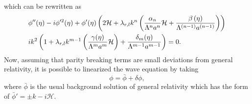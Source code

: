 \documentclass{article}
\begin{document}
which can be rewritten as
\begin{align}
    & \phi''(\eta) - i\phi'^{2}(\eta) + \phi'(\eta)
    \left(2\mathcal{H} + \lambda_{r,l}k^{n}
    \left(\frac{\alpha_{n}}{\Lambda^n a^n}\mathcal{H} + 
    \frac{\beta\left(\eta\right)}{\Lambda^{(n-1)}a^{(n-1)}}\right)\right) \notag \\
    & i k^2 \left(1 + \lambda_{r,l}k^{m-1}
    \left(\frac{\gamma(\eta)}{\Lambda^m a^m}\mathcal{H}\right) 
    + \frac{\delta_{m}(\eta)}{\Lambda^{m-1}a^{m-1}}\right) = 0.
\end{align}
Now, assuming that parity breaking terms are small deviations from general relativity,
it is possible to linearized the wave equation by taking
\begin{equation}
    \phi = \bar{\phi} + \delta \phi,
\end{equation}
where $\bar{\phi}$ is the usual background solution of general relativity which has 
the form of $\bar{\phi} ' = \pm k - i\mathcal{H}$.



\end{document}
